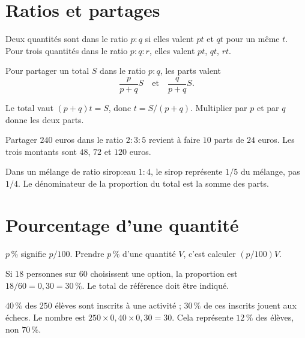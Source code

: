\documentclass[../cours_3e.tex]{subfiles}
\begin{document}
\section{Ratios et partages}
\begin{definition}
Deux quantités sont dans le ratio $p:q$ si elles valent $pt$ et $qt$ pour un même $t$. Pour trois quantités dans le ratio $p:q:r$, elles valent $pt$, $qt$, $rt$.
\end{definition}
\begin{propriete}
Pour partager un total $S$ dans le ratio $p:q$, les parts valent
\[\frac{p}{p+q}S\quad\text{et}\quad\frac{q}{p+q}S.\]
\end{propriete}
\begin{demonstration}
Le total vaut $(p+q)t=S$, donc $t=S/(p+q)$. Multiplier par $p$ et par $q$ donne les deux parts.
\end{demonstration}
\begin{exemple}
Partager $240$ euros dans le ratio $2:3:5$ revient à faire $10$ parts de $24$ euros. Les trois montants sont $48$, $72$ et $120$ euros.
\end{exemple}
\begin{attention}
Dans un mélange de ratio sirop:eau $1:4$, le sirop représente $1/5$ du mélange, pas $1/4$. Le dénominateur de la proportion du total est la somme des parts.
\end{attention}
\section{Pourcentage d'une quantité}
\begin{definition}
$p\,\%$ signifie $p/100$. Prendre $p\,\%$ d'une quantité $V$, c'est calculer $(p/100)V$.
\end{definition}
Si $18$ personnes sur $60$ choisissent une option, la proportion est $18/60=0{,}30=30\,\%$. Le total de référence doit être indiqué.
\begin{exemple}
$40\,\%$ des $250$ élèves sont inscrits à une activité ; $30\,\%$ de ces inscrits jouent aux échecs. Le nombre est $250\times0{,}40\times0{,}30=30$. Cela représente $12\,\%$ des élèves, non $70\,\%$.
\end{exemple}
\end{document}
